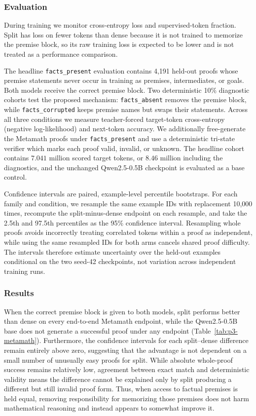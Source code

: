 \documentclass{article}
\begin{document}
\subsubsection{Evaluation}

During training we monitor cross-entropy loss and supervised-token fraction. Split has loss on fewer tokens than dense because it is not trained to memorize the premise block, so its raw training loss is expected to be lower and is not treated as a performance comparison.

The headline \texttt{facts\_present} evaluation contains 4,191 held-out proofs whose premise statements never occur in training as premises, intermediates, or goals. Both models receive the correct premise block. Two deterministic 10\% diagnostic cohorts test the proposed mechanism: \texttt{facts\_absent} removes the premise block, while \texttt{facts\_corrupted} keeps premise names but swaps their statements. Across all three conditions we measure teacher-forced target-token cross-entropy (negative log-likelihood) and next-token accuracy. We additionally free-generate the Metamath proofs under \texttt{facts\_present} and use a deterministic tri-state verifier which marks each proof valid, invalid, or unknown. The headline cohort contains $7.041$ million scored target tokens, or $8.46$ million including the diagnostics, and the unchanged Qwen2.5-0.5B checkpoint is evaluated as a base control.

Confidence intervals are paired, example-level percentile bootstraps. For each family and condition, we resample the same example IDs with replacement 10,000 times, recompute the split-minus-dense endpoint on each resample, and take the 2.5th and 97.5th percentiles as the 95\% confidence interval. Resampling whole proofs avoids incorrectly treating correlated tokens within a proof as independent, while using the same resampled IDs for both arms cancels shared proof difficulty. The intervals therefore estimate uncertainty over the held-out examples conditional on the two seed-42 checkpoints, not variation across independent training runs.

\subsubsection{Results}

When the correct premise block is given to both models, split performs better than dense on every end-to-end Metamath endpoint, while the Qwen2.5-0.5B base does not generate a successful proof under any endpoint (Table~\ref{tab:p3-metamath}). Furthermore, the confidence intervals for each split--dense difference remain entirely above zero, suggesting that the advantage is not dependent on a small number of unusually easy proofs for split. While absolute whole-proof success remains relatively low, agreement between exact match and deterministic validity means the difference cannot be explained only by split producing a different but still invalid proof form. Thus, when access to factual premises is held equal, removing responsibility for memorizing those premises does not harm mathematical reasoning and instead appears to somewhat improve it.
\end{document}
